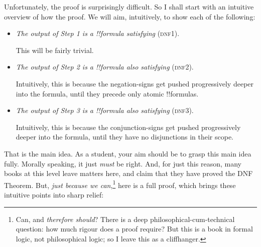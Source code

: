 \documentclass[../../../include/open-logic-section]{subfiles}
\begin{document}
Unfortunately, the proof is surprisingly difficult. So I shall start with an intuitive overview of how the proof. We will aim, intuitively, to show each of the following:
\begin{itemize}	
	\item \emph{The output of Step 1 is a !!{formula} satisfying} (\textsc{dnf1}).

	This will be fairly trivial.
	
	\item \emph{The output of Step 2 is a !!{formula} also satisfying} (\textsc{dnf2}). 
	
	Intuitively, this is because the negation-signs get pushed progressively deeper into the formula, until they precede only atomic !!{formula}s.
	
	\item \emph{The output of Step 3 is a !!{formula} also satisfying} (\textsc{dnf3}).
	
	Intuitively, this is because the conjunction-signs get pushed progressively deeper into the formula, until they have no disjunctions in their scope.
\end{itemize}
That is the main idea. As a student, your aim should be to grasp this main idea fully. Morally speaking, it just \emph{must} be right. And, for just this reason, many books at this level leave matters here, and claim that they have proved the DNF Theorem. But, \emph{just because we can},\footnote{Can, and \emph{therefore should}? There is a deep philosophical-cum-technical question: how much rigour does a proof require? But this is a book in formal logic, not philosophical logic; so I leave this as a cliffhanger.} here is a full proof, which brings these intuitive points into sharp relief:
\end{document}
